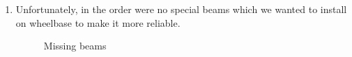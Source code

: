 \begin{enumerate}
\begin{enumerate}
		\item Unfortunately, in the order were no special beams which we wanted to install on wheelbase to make it more reliable.
		\begin{figure}[H]
			\begin{minipage}[h]{0.47\linewidth}
			\end{minipage}
			\hfill
			\begin{minipage}[h]{0.47\linewidth}
			\end{minipage}
			\caption{Missing beams}
		\end{figure}
		

\end{enumerate}
\end{enumerate}
